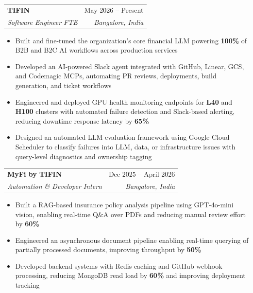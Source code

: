 \documentclass[letterpaper,11pt]{article}
\makeatletter
\newcommand{\resumeItem}[1]{
  \item\small{
    {#1 \vspace{-2pt}}
  }
}
\newcommand{\resumeSubheading}[4]{
  \vspace{-2pt}\item
    \begin{tabular*}{0.97\textwidth}[t]{l@{\extracolsep{\fill}}r}
      \textbf{#1} & #2 \\
      \textit{\small#3} & \textit{\small #4} \\
    \end{tabular*}\vspace{-7pt}
}
\newcommand{\resumeSubSubheading}[2]{
    \item
    \begin{tabular*}{0.97\textwidth}{l@{\extracolsep{\fill}}r}
      \textit{\small#1} & \textit{\small #2} \\
    \end{tabular*}\vspace{-7pt}
}
\newcommand{\resumeSubHeadingListEnd}{\end{itemize}}
\newcommand{\resumeItemListStart}{\begin{itemize}[leftmargin=*,itemsep=1pt,parsep=1pt]}
\newcommand{\resumeItemListEnd}{\end{itemize}\vspace{-8pt}}
\makeatother
\begin{document}
\resumeSubheading
      {TIFIN}{May 2026 -- Present}
      {Software Engineer FTE}{Bangalore, India}
      \resumeItemListStart
        \resumeItem{Built and fine-tuned the organization’s core financial LLM powering \textbf{100\%} of B2B and B2C AI workflows across production services}
        
        \resumeItem{Developed an AI-powered Slack agent integrated with GitHub, Linear, GCS, and Codemagic MCPs, automating PR reviews, deployments, build generation, and ticket workflows}
        
        \resumeItem{Engineered and deployed GPU health monitoring endpoints for \textbf{L40} and \textbf{H100} clusters with automated failure detection and Slack-based alerting, reducing downtime response latency by \textbf{65\%}}
        
        \resumeItem{Designed an automated LLM evaluation framework using Google Cloud Scheduler to classify failures into LLM, data, or infrastructure issues with query-level diagnostics and ownership tagging}
      \resumeItemListEnd
      
\resumeSubheading
      {MyFi by TIFIN}{Dec 2025 -- April 2026}
      {Automation \& Developer Intern}{Bangalore, India}
      \resumeItemListStart
        \resumeItem{Built a RAG-based insurance policy analysis pipeline using GPT-4o-mini vision, enabling real-time Q\&A over PDFs and reducing manual review effort by \textbf{60\%}}
        \resumeItem{Engineered an asynchronous document pipeline enabling real-time querying of partially processed documents, improving throughput by \textbf{50\%}}
        \resumeItem{Developed backend systems with Redis caching and GitHub webhook processing, reducing MongoDB read load by \textbf{60\%} and improving deployment tracking}
      \resumeItemListEnd
\end{document}
